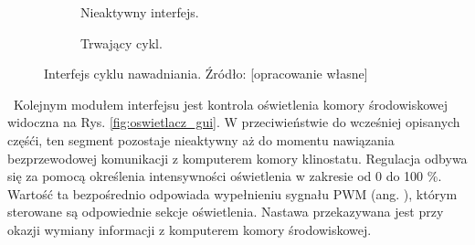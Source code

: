 \begin{figure}
	\centering
	
	\begin{subfigure}[h]{.49\textwidth}
		\centering
		\setlength{\fboxsep}{0pt}
		\setlength{\fboxrule}{1pt}
		\caption{Nieaktywny interfejs.}
		\label{fig:woda_gui_nieaktywne}
	\end{subfigure}
	\hfill%
	\begin{subfigure}[h]{.49\textwidth}
		\centering
		\setlength{\fboxsep}{0pt}
		\setlength{\fboxrule}{1pt}
		\caption{Trwający cykl.} 
		\label{fig:woda_gui_aktywne}
	\end{subfigure}
	
	\caption{Interfejs cyklu nawadniania. Źródło: [opracowanie własne]}
	\label{fig:nawadnianie_gui}
	
\end{figure}\
Kolejnym modułem interfejsu jest kontrola oświetlenia komory środowiskowej widoczna na Rys. \ref{fig:oswietlacz_gui}. W przeciwieństwie do wcześniej opisanych częśći, ten segment pozostaje nieaktywny aż do momentu nawiązania bezprzewodowej komunikacji z komputerem komory klinostatu. Regulacja odbywa się za pomocą określenia intensywności oświetlenia w zakresie od 0 do 100 \%. Wartość ta bezpośrednio odpowiada wypełnieniu sygnału PWM (ang. ), którym sterowane są odpowiednie sekcje oświetlenia. Nastawa przekazywana jest przy okazji wymiany informacji z komputerem komory środowiskowej.\\

